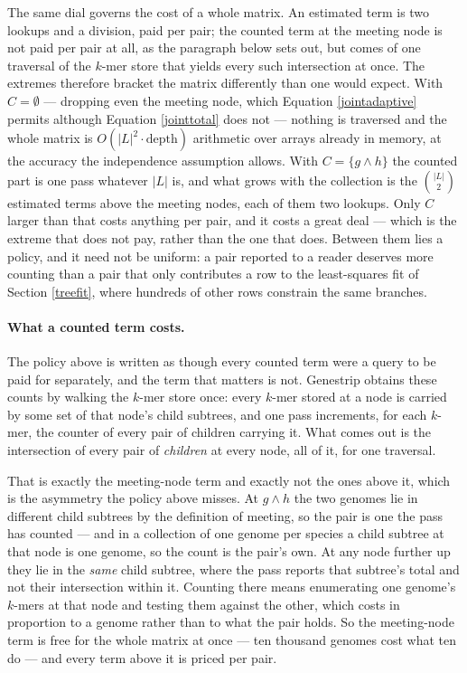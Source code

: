 \documentclass[pdflatex,sn-vancouver-num]{sn-jnl}
\begin{document}
The same dial governs the cost of a whole matrix. An estimated term is two lookups and a division,
paid per pair; the counted term at the meeting node is not paid per pair at all, as the paragraph
below sets out, but comes of one traversal of the $k$-mer store that yields every such intersection at
once. The extremes
therefore bracket the matrix differently than one would expect. With $C = \emptyset$ --- dropping even
the meeting node, which Equation \eqref{jointadaptive} permits although Equation \eqref{jointtotal}
does not --- nothing is traversed and the whole matrix is $O(\lvert L \rvert^2 \cdot \text{depth})$
arithmetic over arrays already in memory, at the accuracy the independence assumption allows. With
$C = \{g \wedge h\}$ the counted part is one pass whatever $\lvert L \rvert$ is, and what grows with
the collection is the $\binom{\lvert L \rvert}{2}$ estimated terms above the meeting nodes, each of
them two lookups. Only $C$ larger than that costs anything per pair, and it costs a great deal ---
which is the extreme that does not pay, rather than the one that does.
Between them lies a policy, and it need not be uniform: a pair reported to a reader deserves more
counting than a pair that only contributes a row to the least-squares fit of
Section \ref{treefit}, where hundreds of other rows constrain the same branches.

\paragraph{What a counted term costs.} The policy above is written as though every counted term were
a query to be paid for separately, and the term that matters is not. Genestrip obtains these counts by
walking the $k$-mer store once: every $k$-mer stored at a node is carried by some set of that node's
child subtrees, and one pass increments, for each $k$-mer, the counter of every pair of children
carrying it. What comes out is the intersection of every pair of \emph{children} at every node, all of
it, for one traversal.

That is exactly the meeting-node term and exactly not the ones above it, which is the asymmetry the
policy above misses. At $g \wedge h$ the two genomes lie in different child subtrees by the definition
of meeting, so the pair is one the pass has counted --- and in a collection of one genome per species a
child subtree at that node is one genome, so the count is the pair's own. At any node further up they
lie in the \emph{same} child subtree, where the pass reports that subtree's total and not their
intersection within it. Counting there means enumerating one genome's $k$-mers at that node and
testing them against the other, which costs in proportion to a genome rather than to what the pair
holds. So the meeting-node term is free for the whole matrix at once --- ten thousand genomes cost
what ten do --- and every term above it is priced per pair.
\end{document}
